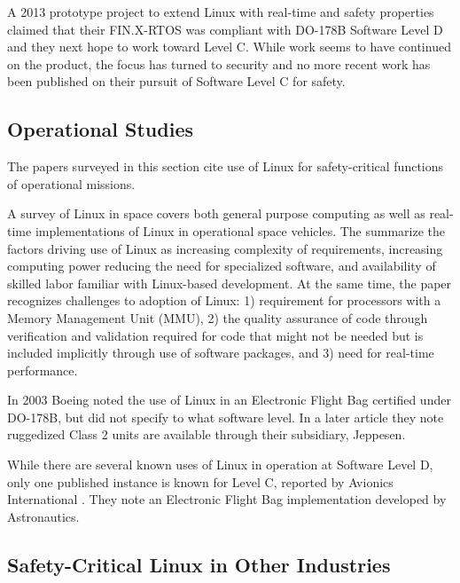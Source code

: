 A 2013 prototype project to extend Linux with real-time and safety properties \cite{cotroneo2013fault} claimed that their FIN.X-RTOS was compliant with DO-178B Software Level D and they next hope to work toward Level C. While work seems to have continued on the product, the focus has turned to security and no more recent work has been published on their pursuit of Software Level C for safety.

\subsection{Operational Studies}

The papers surveyed in this section cite use of Linux for safety-critical functions of operational missions.

A survey of Linux in space \cite{leppinen2017} covers both general purpose computing as well as real-time implementations of Linux in operational space vehicles. The summarize the factors driving use of Linux as increasing complexity of requirements, increasing computing power reducing the need for specialized software, and availability of skilled labor familiar with Linux-based development. At the same time, the paper recognizes  challenges to adoption of Linux: 1) requirement for processors with a Memory Management Unit (MMU), 2) the quality assurance of code through verification and validation required for code that might not be needed but is included implicitly through use of software packages, and 3) need for real-time performance. 

In 2003 Boeing noted the use of Linux in an Electronic Flight Bag \cite{allen2003efb} certified under DO-178B, but did not specify to what software level. In a later article \cite{allen2008electronic} they note ruggedized Class 2 units are available through their subsidiary, Jeppesen.

While there are several known uses of Linux in operation at Software Level D, only one published instance is known for Level C, reported by Avionics International \cite{adams2015}. They note an Electronic Flight Bag implementation developed by Astronautics.

\subsection{Safety-Critical Linux in Other Industries}

